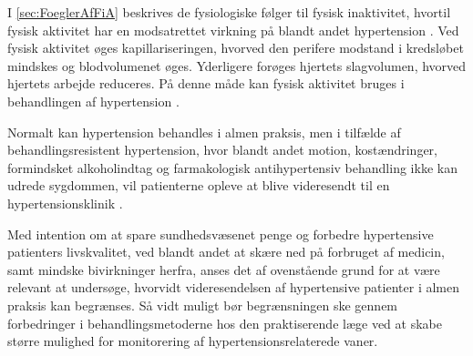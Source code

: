I \autoref{sec:FoeglerAfFiA} beskrives de fysiologiske følger til fysisk inaktivitet, hvortil fysisk aktivitet har en modsatrettet virkning på blandt andet hypertension \citep{pedersen2011}. Ved fysisk aktivitet øges kapillariseringen, hvorved den perifere modstand i kredsløbet mindskes og blodvolumenet øges. Yderligere forøges hjertets slagvolumen, hvorved hjertets arbejde reduceres. På denne måde kan fysisk aktivitet bruges i behandlingen af hypertension \citep{andersen2001}.

Normalt kan hypertension behandles i almen praksis, men i tilfælde af behandlingsresistent hypertension, hvor blandt andet motion, kostændringer, formindsket alkoholindtag og farmakologisk antihypertensiv behandling ikke kan udrede sygdommen, vil patienterne opleve at blive videresendt til en hypertensionsklinik \cite{lodberg2016, bech2015}.

Med intention om at spare sundhedsvæsenet penge og forbedre hypertensive patienters livskvalitet, ved blandt andet at skære ned på forbruget af medicin, samt mindske bivirkninger herfra, anses det af ovenstående grund for at være relevant at undersøge, hvorvidt videresendelsen af hypertensive patienter i almen praksis kan begrænses. Så vidt muligt bør begrænsningen ske gennem forbedringer i behandlingsmetoderne hos den praktiserende læge ved at skabe større mulighed for monitorering af hypertensionsrelaterede vaner. 